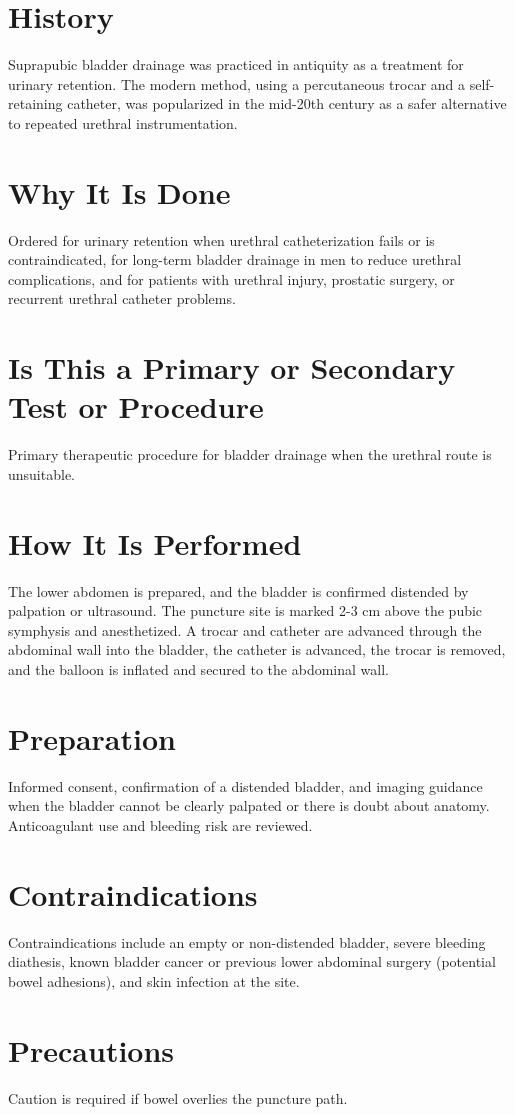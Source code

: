 \section*{History}
Suprapubic bladder drainage was practiced in antiquity as a treatment for urinary retention. The modern method, using a percutaneous trocar and a self-retaining catheter, was popularized in the mid-20th century as a safer alternative to repeated urethral instrumentation.
\section*{Why It Is Done}
Ordered for urinary retention when urethral catheterization fails or is contraindicated, for long-term bladder drainage in men to reduce urethral complications, and for patients with urethral injury, prostatic surgery, or recurrent urethral catheter problems.
\section*{Is This a Primary or Secondary Test or Procedure}
Primary therapeutic procedure for bladder drainage when the urethral route is unsuitable.
\section*{How It Is Performed}
The lower abdomen is prepared, and the bladder is confirmed distended by palpation or ultrasound. The puncture site is marked 2-3 cm above the pubic symphysis and anesthetized. A trocar and catheter are advanced through the abdominal wall into the bladder, the catheter is advanced, the trocar is removed, and the balloon is inflated and secured to the abdominal wall.
\section*{Preparation}
Informed consent, confirmation of a distended bladder, and imaging guidance when the bladder cannot be clearly palpated or there is doubt about anatomy. Anticoagulant use and bleeding risk are reviewed.
\section*{Contraindications}
Contraindications include an empty or non-distended bladder, severe bleeding diathesis, known bladder cancer or previous lower abdominal surgery (potential bowel adhesions), and skin infection at the site.

\section*{Precautions}
Caution is required if bowel overlies the puncture path.

